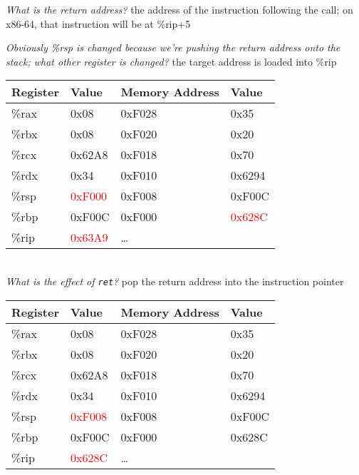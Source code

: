 \documentclass{article}
\begin{document}
\textit{What is the return address?} the address of the instruction following the call; on x86-64, that instruction will be at \%rip+5

\textit{Obviously \%rsp is changed because we're pushing the return address onto the stack; what other register is changed?} the target address is loaded into \%rip \\
\begin{tabular}{|l|l||l|l|} \hline
Register & Value & Memory Address & Value \\ \hline
\%rax & 0x08   & 0xF028 & 0x35   \\ \hline
\%rbx & 0x08   & 0xF020 & 0x20   \\ \hline
\%rcx & 0x62A8 & 0xF018 & 0x70   \\ \hline
\%rdx & 0x34   & 0xF010 & 0x6294 \\ \hline
\%rsp & \textcolor{red}{0xF000} & 0xF008 & 0xF00C \\ \hline
\%rbp & 0xF00C & 0xF000 & \textcolor{red}{0x628C}   \\ \hline
\%rip & \textcolor{red}{0x63A9} & \dots  &        \\ \hline
\end{tabular} \\

\textit{What is the effect of \texttt{ret}?} pop the return address into the instruction pointer \\
\begin{tabular}{|l|l||l|l|} \hline
Register & Value & Memory Address & Value \\ \hline
\%rax & 0x08   & 0xF028 & 0x35   \\ \hline
\%rbx & 0x08   & 0xF020 & 0x20   \\ \hline
\%rcx & 0x62A8 & 0xF018 & 0x70   \\ \hline
\%rdx & 0x34   & 0xF010 & 0x6294 \\ \hline
\%rsp & \textcolor{red}{0xF008} & 0xF008 & 0xF00C \\ \hline
\%rbp & 0xF00C & 0xF000 & 0x628C   \\ \hline
\%rip & \textcolor{red}{0x628C} & \dots  &        \\ \hline
\end{tabular} \\
\end{document}
